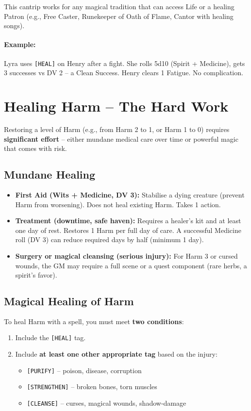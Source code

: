 \noindent This cantrip works for any magical tradition that can access Life or a healing Patron (e.g., Free Caster, Runekeeper of Oath of Flame, Cantor with healing songs).

\paragraph{Example:} Lyra uses \texttt{[HEAL]} on Henry after a fight. She rolls 5d10 (Spirit + Medicine), gets 3 successes vs DV 2 -- a Clean Success. Henry clears 1 Fatigue. No complication.

\section{Healing Harm -- The Hard Work}
\label{sec:healing-harm}

Restoring a level of Harm (e.g., from Harm 2 to 1, or Harm 1 to 0) requires \textbf{significant effort} -- either mundane medical care over time or powerful magic that comes with risk.

\subsection{Mundane Healing}
\label{subsec:mundane-healing}

\begin{itemize}
  \item \textbf{First Aid (Wits + Medicine, DV 3):} Stabilise a dying creature (prevent Harm from worsening). Does not heal existing Harm. Takes 1 action.
  \item \textbf{Treatment (downtime, safe haven):} Requires a healer's kit and at least one day of rest. Restores 1 Harm per full day of care. A successful Medicine roll (DV 3) can reduce required days by half (minimum 1 day).
  \item \textbf{Surgery or magical cleansing (serious injury):} For Harm 3 or cursed wounds, the GM may require a full scene or a quest component (rare herbs, a spirit's favor).
\end{itemize}

\subsection{Magical Healing of Harm}
\label{subsec:magic-healing-harm}

To heal Harm with a spell, you must meet \textbf{two conditions}:

\begin{enumerate}
  \item Include the \texttt{[HEAL]} tag.
  \item Include \textbf{at least one other appropriate tag} based on the injury:
    \begin{itemize}
      \item \texttt{[PURIFY]} -- poison, disease, corruption
      \item \texttt{[STRENGTHEN]} -- broken bones, torn muscles
      \item \texttt{[CLEANSE]} -- curses, magical wounds, shadow-damage
    \end{itemize}
\end{enumerate}

